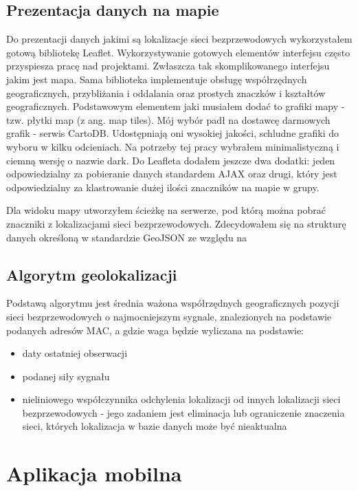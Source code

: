 \subsection{Prezentacja danych na mapie}
Do prezentacji danych jakimi są lokalizacje sieci bezprzewodowych wykorzystałem gotową bibliotekę Leaflet. Wykorzystywanie gotowych elementów interfejsu często przyspiesza pracę nad projektami. Zwłaszcza tak skomplikowanego interfejsu jakim jest mapa. Sama biblioteka implementuje obsługę współrzędnych geograficznych, przybliżania i oddalania oraz prostych znaczków i kształtów geograficznych. Podstawowym elementem jaki musiałem dodać to grafiki mapy - tzw. płytki map (z ang. map tiles). Mój wybór padł na dostawcę darmowych grafik - serwis CartoDB. Udostępniają oni wysokiej jakości, schludne grafiki do wyboru w kilku odcieniach. Na potrzeby tej pracy wybrałem minimalistyczną i ciemną wersję o nazwie dark. Do Leafleta dodałem jeszcze dwa dodatki: jeden odpowiedzialny za pobieranie danych standardem AJAX oraz drugi, który jest odpowiedzialny za klastrowanie dużej ilości znaczników na mapie w grupy.

Dla widoku mapy utworzyłem ścieżkę na serwerze, pod którą można pobrać znaczniki z lokalizacjami sieci bezprzewodowych. Zdecydowałem się na strukturę danych określoną w standardzie GeoJSON ze względu na


\subsection{Algorytm geolokalizacji}
Podstawą algorytmu jest średnia ważona współrzędnych geograficznych pozycji sieci bezprzewodowych o najmocniejszym sygnale, znalezionych na podstawie podanych adresów MAC, a gdzie waga będzie wyliczana na podstawie:

\begin{itemize}
\item daty ostatniej obserwacji
\item podanej siły sygnału
\item nieliniowego współczynnika odchylenia lokalizacji od innych lokalizacji sieci bezprzewodowych - jego zadaniem jest eliminacja lub ograniczenie znaczenia sieci, których lokalizacja w bazie danych może być nieaktualna
\end{itemize}

\section{Aplikacja mobilna}
